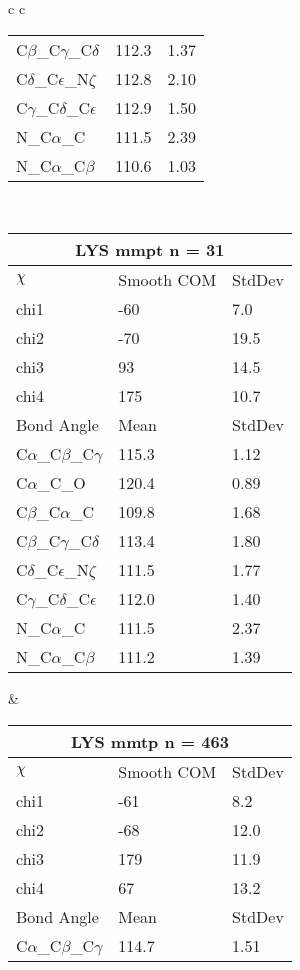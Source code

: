 \begin{longtable}{ c c }
\begin{tabular}{ l l l }
  C$\beta$\_C$\gamma$\_C$\delta$ & 112.3 & 1.37\\
  C$\delta$\_C$\epsilon$\_N$\zeta$ & 112.8 & 2.10\\
  C$\gamma$\_C$\delta$\_C$\epsilon$ & 112.9 & 1.50\\
  N\_C$\alpha$\_C & 111.5 & 2.39\\
  N\_C$\alpha$\_C$\beta$ & 110.6 & 1.03\\
  \bottomrule
  \end{tabular}
  \\
  \begin{tabular}{ l l l }
  \toprule
  \multicolumn{3}{c}{LYS \textbf{mmpt} n = 31} \\ \toprule
  $\chi$       & Smooth COM & StdDev \\ \midrule
  chi1 & -60 & 7.0 \\ 
  chi2 & -70 & 19.5 \\ 
  chi3 & 93 & 14.5 \\ 
  chi4 & 175 & 10.7 \\ \midrule
  Bond Angle   & Mean     & StdDev \\ \midrule
  C$\alpha$\_C$\beta$\_C$\gamma$ & 115.3 & 1.12\\
  C$\alpha$\_C\_O & 120.4 & 0.89\\
  C$\beta$\_C$\alpha$\_C & 109.8 & 1.68\\
  C$\beta$\_C$\gamma$\_C$\delta$ & 113.4 & 1.80\\
  C$\delta$\_C$\epsilon$\_N$\zeta$ & 111.5 & 1.77\\
  C$\gamma$\_C$\delta$\_C$\epsilon$ & 112.0 & 1.40\\
  N\_C$\alpha$\_C & 111.5 & 2.37\\
  N\_C$\alpha$\_C$\beta$ & 111.2 & 1.39\\
  \bottomrule
  \end{tabular}
  &
  \begin{tabular}{ l l l }
  \toprule
  \multicolumn{3}{c}{LYS \textbf{mmtp} n = 463} \\ \toprule
  $\chi$       & Smooth COM & StdDev \\ \midrule
  chi1 & -61 & 8.2 \\ 
  chi2 & -68 & 12.0 \\ 
  chi3 & 179 & 11.9 \\ 
  chi4 & 67 & 13.2 \\ \midrule
  Bond Angle   & Mean     & StdDev \\ \midrule
  C$\alpha$\_C$\beta$\_C$\gamma$ & 114.7 & 1.51\\

\end{tabular}
\end{longtable}
